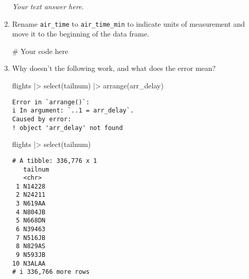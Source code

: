 \documentclass[
  letterpaper,
  DIV=11,
  numbers=noendperiod]{scrreprt}
\newenvironment{Shaded}{\begin{snugshade}}{\end{snugshade}}
\newcommand{\CommentTok}[1]{\textcolor[rgb]{0.37,0.37,0.37}{#1}}
\newcommand{\FunctionTok}[1]{\textcolor[rgb]{0.28,0.35,0.67}{#1}}
\newcommand{\NormalTok}[1]{\textcolor[rgb]{0.00,0.23,0.31}{#1}}
\newcommand{\SpecialCharTok}[1]{\textcolor[rgb]{0.37,0.37,0.37}{#1}}
\begin{document}
\begin{enumerate}
\begin{tcolorbox}
  \emph{Your text answer here.}

  \end{tcolorbox}
\item
  Rename \texttt{air\_time} to \texttt{air\_time\_min} to indicate units
  of measurement and move it to the beginning of the data frame.

  \begin{tcolorbox}[enhanced jigsaw, left=2mm, rightrule=.15mm, bottomtitle=1mm, opacitybacktitle=0.6, leftrule=.75mm, opacityback=0, colframe=quarto-callout-note-color-frame, bottomrule=.15mm, coltitle=black, toptitle=1mm, colback=white, titlerule=0mm, colbacktitle=quarto-callout-note-color!10!white, title={Answer}, toprule=.15mm, breakable, arc=.35mm]

\begin{Shaded}
\begin{Highlighting}[]
\CommentTok{\# Your code here}
\end{Highlighting}
\end{Shaded}

  \end{tcolorbox}
\item
  Why doesn't the following work, and what does the error mean?

\begin{Shaded}
\begin{Highlighting}[]
\NormalTok{flights }\SpecialCharTok{|\textgreater{}} 
  \FunctionTok{select}\NormalTok{(tailnum) }\SpecialCharTok{|\textgreater{}} 
  \FunctionTok{arrange}\NormalTok{(arr\_delay)}
\end{Highlighting}
\end{Shaded}

\begin{verbatim}
Error in `arrange()`:
i In argument: `..1 = arr_delay`.
Caused by error:
! object 'arr_delay' not found
\end{verbatim}

\begin{Shaded}
\begin{Highlighting}[]
\NormalTok{flights }\SpecialCharTok{|\textgreater{}} 
  \FunctionTok{select}\NormalTok{(tailnum)}
\end{Highlighting}
\end{Shaded}

\begin{verbatim}
# A tibble: 336,776 x 1
   tailnum
   <chr>  
 1 N14228 
 2 N24211 
 3 N619AA 
 4 N804JB 
 5 N668DN 
 6 N39463 
 7 N516JB 
 8 N829AS 
 9 N593JB 
10 N3ALAA 
# i 336,766 more rows
\end{verbatim}


\end{enumerate}
\end{document}
